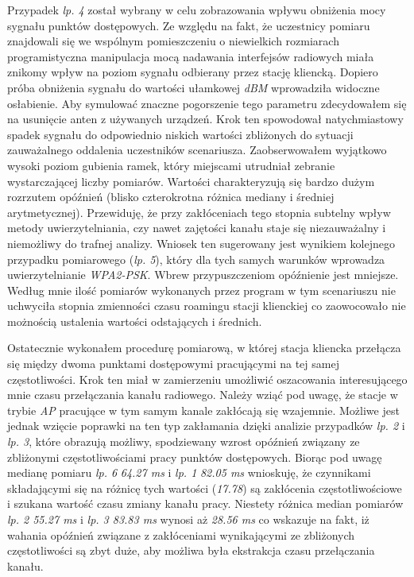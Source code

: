 Przypadek \emph{lp. 4} został wybrany w celu zobrazowania wpływu obniżenia mocy sygnału punktów dostępowych. Ze względu na fakt, że uczestnicy pomiaru znajdowali się we wspólnym pomieszczeniu o niewielkich rozmiarach programistyczna manipulacja mocą nadawania interfejsów radiowych miała znikomy wpływ na poziom sygnału odbierany przez stację kliencką. Dopiero próba obniżenia sygnału do wartości ułamkowej \emph{dBM} wprowadziła widoczne osłabienie. Aby symulować znaczne pogorszenie tego parametru zdecydowałem się na usunięcie anten z używanych urządzeń. Krok ten spowodował natychmiastowy spadek sygnału do odpowiednio niskich wartości zbliżonych do sytuacji zauważalnego oddalenia uczestników scenariusza. Zaobserwowałem wyjątkowo wysoki poziom gubienia ramek, który miejscami utrudniał zebranie wystarczającej liczby pomiarów. Wartości charakteryzują się bardzo dużym rozrzutem opóźnień (blisko czterokrotna różnica mediany i średniej arytmetycznej). Przewiduję, że przy zakłóceniach tego stopnia subtelny wpływ metody uwierzytelniania, czy nawet zajętości kanału staje się niezauważalny i niemożliwy do trafnej analizy. Wniosek ten sugerowany jest wynikiem kolejnego przypadku pomiarowego (\emph{lp. 5}), który dla tych samych warunków wprowadza uwierzytelnianie \emph{WPA2-PSK}. Wbrew przypuszczeniom opóźnienie jest mniejsze. Według mnie ilość pomiarów wykonanych przez program w tym scenariuszu nie uchwyciła stopnia zmienności czasu roamingu stacji klienckiej co zaowocowało nie możnością ustalenia wartości odstających i średnich. 

Ostatecznie wykonałem procedurę pomiarową, w której stacja kliencka przełącza się między dwoma punktami dostępowymi pracującymi na tej samej częstotliwości. Krok ten miał w zamierzeniu umożliwić oszacowania interesującego mnie czasu przełączania kanału radiowego. Należy wziąć pod uwagę, że stacje w trybie \emph{AP} pracujące w tym samym kanale zakłócają się wzajemnie. Możliwe jest jednak wzięcie poprawki na ten typ zakłamania dzięki analizie przypadków \emph{lp. 2} i \emph{lp. 3}, które obrazują możliwy, spodziewany wzrost opóźnień związany ze zbliżonymi częstotliwościami pracy punktów dostępowych. Biorąc pod uwagę medianę pomiaru \emph{lp. 6} \emph{64.27 ms} i \emph{lp. 1} \emph{82.05 ms} wnioskuję, że czynnikami składającymi się na różnicę tych wartości (\emph{17.78}) są zakłócenia częstotliwościowe i szukana wartość czasu zmiany kanału pracy. Niestety różnica median pomiarów \emph{lp. 2 55.27 ms} i \emph{lp. 3 83.83 ms} wynosi aż \emph{28.56 ms} co wskazuje na fakt, iż wahania opóźnień związane z zakłóceniami wynikającymi ze zbliżonych częstotliwości są zbyt duże, aby możliwa była ekstrakcja czasu przełączania kanału. 

